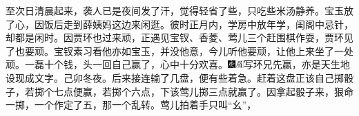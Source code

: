 至次日清晨起来，袭人已是夜间发了汗，觉得轻省了些，只吃些米汤静养。宝玉放了心，因饭后走到薛姨妈这边来闲逛。彼时正月内，学房中放年学，闺阁中忌针，却都是闲时。因贾环也过来顽，正遇见宝钗、香菱、莺儿三个赶围棋作耍，贾环见了也要顽。宝钗素习看他亦如宝玉，并没他意，今儿听他要顽，让他上来坐了一处顽。一磊十个钱，头一回自己赢了，心中十分欢喜。{\includegraphics[width=3mm]{../Images/00004}\includegraphics[width=3mm]{../Images/00010}\footnotesize \kaishu 写环兄先赢，亦是天生地设现成文字。己卯冬夜。}后来接连输了几盘，便有些着急。赶着这盘正该自己掷骰子，若掷个七点便赢，若掷个六点，下该莺儿掷三点就赢了。因拿起骰子来，狠命一掷，一个作定了五，那一个乱转。莺儿拍着手只叫``幺''，{{
}}
